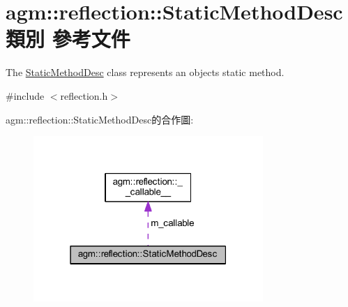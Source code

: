 \hypertarget{classagm_1_1reflection_1_1_static_method_desc}{}\section{agm\+:\+:reflection\+:\+:Static\+Method\+Desc 類別 參考文件}
\label{classagm_1_1reflection_1_1_static_method_desc}


The \hyperlink{classagm_1_1reflection_1_1_static_method_desc}{Static\+Method\+Desc} class represents an object\textquotesingle{}s static method.  




{\ttfamily \#include $<$reflection.\+h$>$}



agm\+:\+:reflection\+:\+:Static\+Method\+Desc的合作圖\+:\nopagebreak
\begin{figure}[H]
\begin{center}
\leavevmode
\includegraphics[width=247pt]{classagm_1_1reflection_1_1_static_method_desc__coll__graph}
\end{center}
\end{figure}
